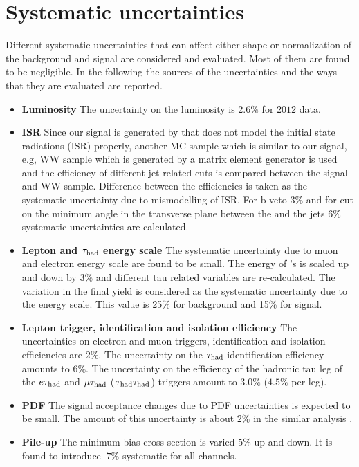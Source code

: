 \section{Systematic uncertainties}
\label{sect:sys}
Different systematic uncertainties that can affect either shape or normalization of the background and  signal are considered and evaluated.
Most of them are found to be negligible. In the following the sources of the uncertainties and the ways that they are evaluated are reported.
\begin {itemize}
\item{{\bf Luminosity}} The uncertainty on the luminosity  is $2.6\%$ for $2012$ data.
\item{\bf ISR}
Since our signal is generated by \PYTHIA that does not  model the initial state radiations (ISR) properly, another MC sample which is similar to our signal, e.g, WW sample 
which is generated by a matrix element generator is used and the efficiency of different jet related cuts is compared between the signal and WW sample. Difference between the
efficiencies is taken as the systematic uncertainty due to mismodelling of ISR. For b-veto 3\% and for cut on   the minimum angle in the transverse plane between 
the \MET and the jets 6\% systematic uncertainties are  calculated.  
\item{\bf Lepton and $\tau_{\rm had}$ energy scale}
The systematic uncertainty due to muon and electron energy scale are found to be small.
The energy of \hadtau's is scaled up and down by $3\%$ and different tau related variables are re-calculated.  The variation in the final yield is considered as the
systematic uncertainty due to the \Tau energy scale. This value is 25\% for background and 15\% for signal.
\item{\bf Lepton trigger, identification and isolation efficiency}
The uncertainties on electron and muon triggers, identification and isolation efficiencies are $2\%$. 
The uncertainty on the $\tau_{\rm had}$ identification efficiency amounts to $6\%$. 
The uncertainty on the efficiency of the hadronic tau leg of the $e\tau_{\rm had}$ and $\mu\tau_{\rm had}$ ($\,\tau_{\rm had}\tau_{\rm had}$) triggers amount to $3.0\%$ ($4.5\%$ per leg).
\item{\bf PDF}
The signal acceptance changes due to PDF uncertainties is expected to be small. 
The amount of this uncertainty is about $2\%$ in the similar analysis \cite{Khachatryan:2014qwa}.
\item{\bf Pile-up}
The minimum bias cross section is varied $5 \%$ up and down. It is found to introduce $~7 \%$ systematic for all channels.    
\end{itemize}



